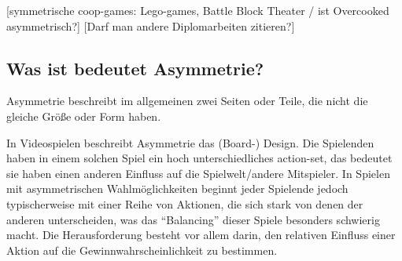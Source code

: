 [symmetrische coop-games: Lego-games, Battle Block Theater / ist Overcooked asymmetrisch?] [Darf man andere Diplomarbeiten zitieren?]

\subsection{Was ist bedeutet Asymmetrie?}
Asymmetrie beschreibt im allgemeinen zwei Seiten oder Teile, die nicht die gleiche Größe oder Form haben.\cite{_oxford_dict}

In Videospielen beschreibt Asymmetrie das (Board-) Design. Die Spielenden haben in einem solchen Spiel ein hoch unterschiedliches action-set, das bedeutet sie haben einen anderen Einfluss auf die Spielwelt/andere Mitspieler. In Spielen mit asymmetrischen Wahlmöglichkeiten beginnt jeder Spielende jedoch typischerweise mit einer Reihe von Aktionen, die sich stark von denen der anderen unterscheiden, was das "`Balancing"' dieser Spiele besonders schwierig macht. Die Herausforderung besteht vor allem darin, den relativen Einfluss einer Aktion auf die Gewinnwahrscheinlichkeit zu bestimmen.\cite{_balancing_asymmetric_video_games}


